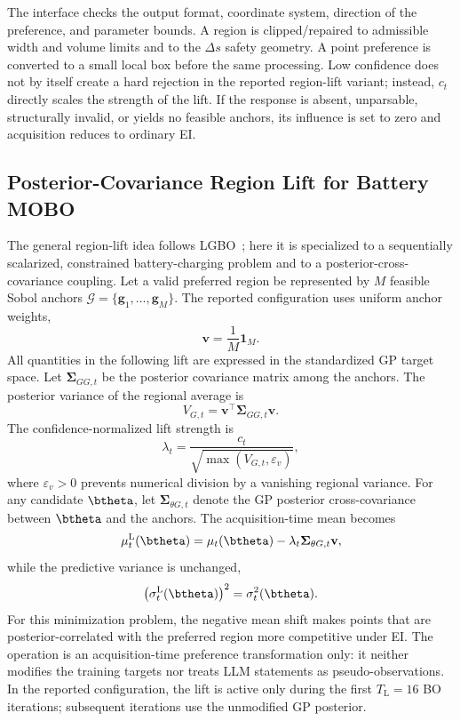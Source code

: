 The interface checks the output format, coordinate system, direction of the
preference, and parameter bounds. A region is clipped/repaired to admissible
width and volume limits and to the $\Delta s$ safety geometry. A point
preference is converted to a small local box before the same processing. Low
confidence does not by itself create a hard rejection in the reported
region-lift variant; instead, $c_t$ directly scales the strength of the lift.
If the response is absent, unparsable, structurally invalid, or yields no
feasible anchors, its influence is set to zero and acquisition reduces to
ordinary EI.

\subsection{Posterior-Covariance Region Lift for Battery MOBO}

The general region-lift idea follows LGBO~\cite{ref16}; here it is specialized
to a sequentially scalarized, constrained battery-charging problem and to a
posterior-cross-covariance coupling. Let a valid preferred region be represented
by $M$ feasible Sobol anchors
$\mathcal{G}=\{\mathbf g_1,\ldots,\mathbf g_M\}$. The reported configuration uses
uniform anchor weights,
\begin{equation}
\mathbf v=\frac{1}{M}\mathbf 1_M.
\label{eq:anchorweight}
\end{equation}
All quantities in the following lift are expressed in the standardized GP target
space. Let $\boldsymbol{\Sigma}_{GG,t}$ be the posterior covariance matrix among
the anchors. The posterior variance of the regional average is
\begin{equation}
V_{G,t}=\mathbf v^{\top}\boldsymbol{\Sigma}_{GG,t}\mathbf v.
\label{eq:regionvar}
\end{equation}
The confidence-normalized lift strength is
\begin{equation}
\lambda_t=
\frac{c_t}{\sqrt{\max(V_{G,t},\varepsilon_v)}},
\label{eq:lambda}
\end{equation}
where $\varepsilon_v>0$ prevents numerical division by a vanishing regional
variance. For any candidate $\btheta$, let
$\boldsymbol{\Sigma}_{\theta G,t}$ denote the GP posterior cross-covariance
between $\btheta$ and the anchors. The acquisition-time mean becomes
\begin{equation}
\mu_t^{\mathrm{L}}(\btheta)=
\mu_t(\btheta)-
\lambda_t\boldsymbol{\Sigma}_{\theta G,t}\mathbf v,
\label{eq:shift}
\end{equation}
while the predictive variance is unchanged,
\begin{equation}
\left(\sigma_t^{\mathrm{L}}(\btheta)\right)^2
=\sigma_t^2(\btheta).
\label{eq:variance_unchanged}
\end{equation}
For this minimization problem, the negative mean shift makes points that are
posterior-correlated with the preferred region more competitive under EI. The
operation is an acquisition-time preference transformation only: it neither
modifies the training targets nor treats LLM statements as pseudo-observations.
In the reported configuration, the lift is active only during the first
$T_{\mathrm L}=16$ BO iterations; subsequent iterations use the unmodified GP
posterior.

